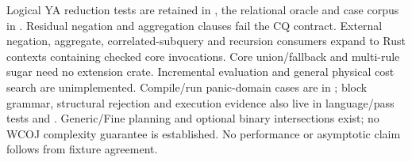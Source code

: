 Logical YA reduction tests are retained in , the
relational oracle and case corpus in .
Residual negation and aggregation clauses fail the CQ contract. External
negation, aggregate, correlated-subquery and recursion consumers expand to
Rust contexts containing checked core invocations. Core union/fallback and
multi-rule sugar need no extension crate. Incremental evaluation and general
physical cost search are unimplemented. Compile/run panic-domain cases are in
; block grammar, structural rejection
and execution evidence also live in language/pass tests and
.
Generic/Fine planning and optional binary intersections exist; no WCOJ
complexity guarantee is established.
No performance or asymptotic claim follows from fixture agreement.
